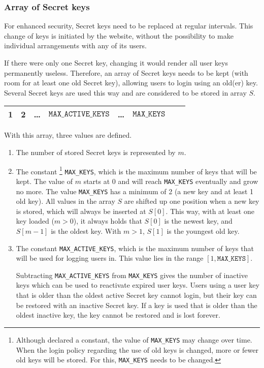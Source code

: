 \subsubsection{Array of Secret keys}
For enhanced security,
Secret keys need to be replaced at regular intervals.
This change of keys is initiated by the website,
without the possibility to make individual arrangements with any of its users.
\par
If there were only one Secret key,
changing it would render all user keys permanently useless.
Therefore,
an array of Secret keys needs to be kept
(with room for at least one old Secret key),
allowing users to login using an old(er) key.
Several Secret keys are used this way and
are considered to be stored in array $S$.
\begin{table}[h]
\begin{tabular}{|c|c|c|c|c|c|c|c|}
\hline
1 & 2 & \ldots & $\mathtt{MAX\_ACTIVE\_KEYS}$ & \ldots & $\mathtt{MAX\_KEYS}$ \\
\hline
\end{tabular}
\end{table}
\par
With this array, three values are defined.
\begin{enumerate}
\item	The number of stored Secret keys is represented by $m$.
\item	The constant%
\footnote{Although declared a constant, the value of \texttt{MAX\_KEYS} may change over time.
When the login policy regarding the use of old keys is changed, more or fewer old keys will be stored.
For this, \texttt{MAX\_KEYS} needs to be changed.}
\texttt{MAX\_KEYS}, which is the maximum number of keys that will be kept.
The value of $m$ starts at 0 and will reach \texttt{MAX\_KEYS} eventually and grow no more.
The value \texttt{MAX\_KEYS} has a minimum of 2 (a new key and at least 1 old key).
All values in the array $S$ are shifted up one position when a new key is stored, which will always be inserted at $S[0]$.
This way, with at least one key loaded ($m>0$), it always holds that $S[0]$ is the newest key,
and $S[m-1]$ is the oldest key.
With $m>1$, $S[1]$ is the youngest old key.
\item	The constant \texttt{MAX\_ACTIVE\_KEYS},
which is the maximum number of keys that will be used for logging users in.
This value lies in the range $[1, \mathtt{MAX\_KEYS}]$.
\par
Subtracting \texttt{MAX\_ACTIVE\_KEYS} from \texttt{MAX\_KEYS}
gives the number of inactive keys which can be used to reactivate expired user keys.
Users using a user key that is older than the oldest active Secret key cannot login,
but their key can be restored with an inactive Secret key.
If a key is used that is older than the oldest inactive key,
the key cannot be restored and is lost forever.
\end{enumerate}
